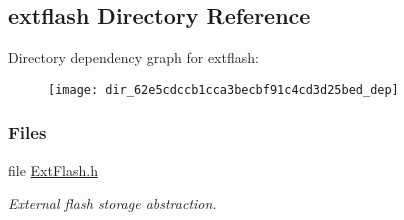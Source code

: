 \subsection{extflash Directory Reference}
\label{dir_62e5cdccb1cca3becbf91c4cd3d25bed}
Directory dependency graph for extflash\+:
\nopagebreak
\begin{figure}[H]
\begin{center}
\leavevmode
\texttt{[image: dir\_62e5cdccb1cca3becbf91c4cd3d25bed\_dep]}
\end{center}
\end{figure}
\subsubsection*{Files}
\begin{DoxyCompactItemize}
\item 
file \hyperlink{_ext_flash_8h}{Ext\+Flash.\+h}
\begin{DoxyCompactList}\small\item\em External flash storage abstraction. \end{DoxyCompactList}\end{DoxyCompactItemize}
